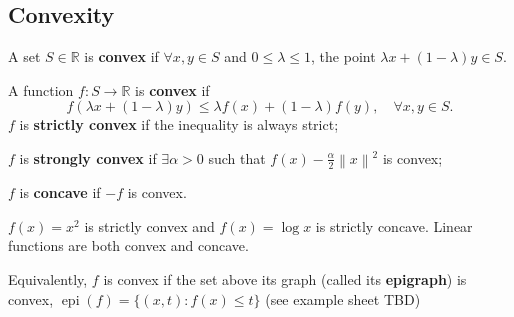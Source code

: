 \subsection{Convexity}
\begin{definition}
    A set $S\in \mathbb{R}$ is \textbf{convex} if $ \forall x,y\in S $ and $ 0\le \lambda\le 1 $, the point $ \lambda x+ (1-\lambda) y \in S $. 
\end{definition}
\begin{definition}
    A function $f:S\to \mathbb{R}$ is \textbf{convex} if 
    \[
        f(\lambda x+(1-\lambda)y)\le \lambda f(x)+ (1-\lambda)f(y),\quad \forall x,y\in S.
    \]
    $f$ is \textbf{strictly convex} if the inequality is always strict; 

    $f$ is \textbf{strongly convex} if $ \exists \alpha>0$ such that $ f(x)-\frac{\alpha}{2}\left\| x \right\|^2 $ is convex; 

    $f$ is \textbf{concave} if $-f$ is convex.
\end{definition}

\begin{example}
    $f(x)=x^2$ is strictly convex and $ f(x)=\log x $ is strictly concave. Linear functions are both convex and concave.
\end{example}

\begin{note}
    Equivalently, $f$ is convex if the set above its graph (called its \textbf{epigraph}) is convex, $\operatorname{epi}(f)=\{(x, t): f(x) \leq t\}$ (see example sheet TBD)
\end{note}

